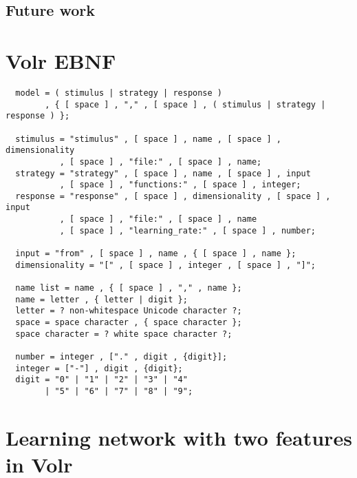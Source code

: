 \documentclass[a4paper,oneside]{memoir}
\begin{document}
\section{Future work}

\clearpage

\printglossary

\printbibliography

\newpage

\appendix
\chapter{Volr EBNF}
\label{ebnf}

\begin{verbatim}
  model = ( stimulus | strategy | response )
        , { [ space ] , "," , [ space ] , ( stimulus | strategy | response ) };

  stimulus = "stimulus" , [ space ] , name , [ space ] , dimensionality
           , [ space ] , "file:" , [ space ] , name;
  strategy = "strategy" , [ space ] , name , [ space ] , input
           , [ space ] , "functions:" , [ space ] , integer;
  response = "response" , [ space ] , dimensionality , [ space ] , input
           , [ space ] , "file:" , [ space ] , name
           , [ space ] , "learning_rate:" , [ space ] , number;

  input = "from" , [ space ] , name , { [ space ] , name };
  dimensionality = "[" , [ space ] , integer , [ space ] , "]";

  name list = name , { [ space ] , "," , name };
  name = letter , { letter | digit };
  letter = ? non-whitespace Unicode character ?;
  space = space character , { space character };
  space character = ? white space character ?;

  number = integer , ["." , digit , {digit}];
  integer = ["-"] , digit , {digit};
  digit = "0" | "1" | "2" | "3" | "4"
        | "5" | "6" | "7" | "8" | "9";
\end{verbatim}

\clearpage

\appendix
\chapter{Learning network with two features in Volr}



\clearpage
\end{document}
